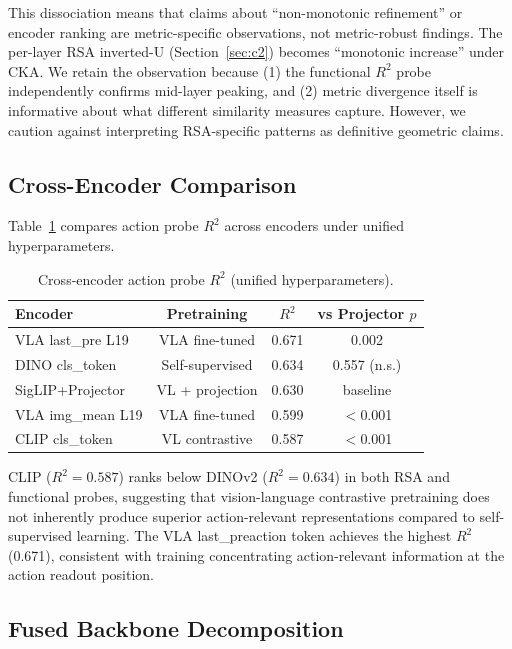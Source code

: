 \documentclass[10pt,letterpaper]{article}
\begin{document}
This dissociation means that claims about ``non-monotonic refinement'' or encoder ranking are metric-specific observations, not metric-robust findings. The per-layer RSA inverted-U (Section~\ref{sec:c2}) becomes ``monotonic increase'' under CKA. We retain the observation because (1) the functional $R^2$ probe independently confirms mid-layer peaking, and (2) metric divergence itself is informative about what different similarity measures capture. However, we caution against interpreting RSA-specific patterns as definitive geometric claims.

\subsection{Cross-Encoder Comparison}

Table~\ref{tab:cross_encoder} compares action probe $R^2$ across encoders under unified hyperparameters.

\begin{table}[h]
\centering
\caption{Cross-encoder action probe $R^2$ (unified hyperparameters).}
\label{tab:cross_encoder}
\begin{tabular}{lccc}
\toprule
Encoder & Pretraining & $R^2$ & vs Projector $p$ \\
\midrule
VLA last\_pre L19 & VLA fine-tuned & 0.671 & 0.002 \\
DINO cls\_token & Self-supervised & 0.634 & 0.557 (n.s.) \\
SigLIP+Projector & VL + projection & 0.630 & baseline \\
VLA img\_mean L19 & VLA fine-tuned & 0.599 & $<$0.001 \\
CLIP cls\_token & VL contrastive & 0.587 & $<$0.001 \\
\bottomrule
\end{tabular}
\end{table}

CLIP ($R^2 = 0.587$) ranks below DINOv2 ($R^2 = 0.634$) in both RSA and functional probes, suggesting that vision-language contrastive pretraining does not inherently produce superior action-relevant representations compared to self-supervised learning. The VLA last\_preaction token achieves the highest $R^2$ (0.671), consistent with training concentrating action-relevant information at the action readout position.

\subsection{Fused Backbone Decomposition}
\end{document}
